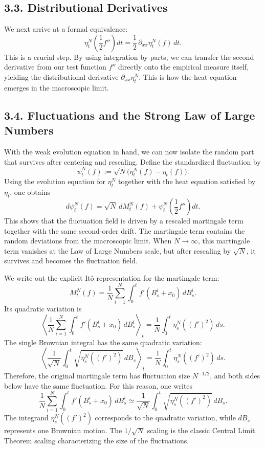 \documentclass[11pt]{article}
\theoremstyle{definition}
\theoremstyle{remark}
\begin{document}
\subsection*{3.3. Distributional Derivatives}
We next arrive at a formal equivalence:
\[
\eta_t^N\!\left(\frac{1}{2}f''\right)dt=\frac{1}{2}\,\partial_{xx}\eta_t^N(f)\,dt.
\]
This is a crucial step. By using integration by parts, we can transfer the second derivative from our test function $f''$ directly onto the empirical measure itself, yielding the distributional derivative $\partial_{xx}\eta_t^N$. This is how the heat equation emerges in the macroscopic limit.

\subsection*{3.4. Fluctuations and the Strong Law of Large Numbers}
With the weak evolution equation in hand, we can now isolate the random part that survives after centering and rescaling. Define the standardized fluctuation by
\[
\psi_t^N(f):=\sqrt{N}\bigl(\eta_t^N(f)-\eta_t(f)\bigr).
\]
Using the evolution equation for $\eta_t^N$ together with the heat equation satisfied by $\eta_t$, one obtains
\[
d\psi_t^N(f)=\sqrt{N}\,dM_t^N(f)+\psi_t^N\!\left(\frac{1}{2}f''\right)dt.
\]
This shows that the fluctuation field is driven by a rescaled martingale term together with the same second-order drift. The martingale term contains the random deviations from the macroscopic limit. When $N\to\infty$, this martingale term vanishes at the Law of Large Numbers scale, but after rescaling by $\sqrt{N}$, it survives and becomes the fluctuation field.

We write out the explicit It\^o representation for the martingale term:
\[
M_t^N(f)=\frac{1}{N}\sum_{i=1}^N \int_0^t f'(B_s^i+x_0)\,dB_s^i.
\]
Its quadratic variation is
\[
\left\langle
\frac{1}{N}\sum_{i=1}^N \int_0^t f'(B_s^i+x_0)\,dB_s^i
\right\rangle_t
=
\frac{1}{N}\int_0^t \eta_s^N((f')^2)\,ds.
\]
The single Brownian integral has the same quadratic variation:
\[
\left\langle
\frac{1}{\sqrt{N}}\int_0^t \sqrt{\eta_s^N((f')^2)}\,dB_s
\right\rangle_t
=
\frac{1}{N}\int_0^t \eta_s^N((f')^2)\,ds.
\]
Therefore, the original martingale term has fluctuation size $N^{-1/2}$, and both sides below have the same fluctuation. For this reason, one writes
\[
\frac{1}{N}\sum_{i=1}^N \int_0^t f'(B_s^i+x_0)\,dB_s^i \simeq \frac{1}{\sqrt{N}}\int_0^t \sqrt{\eta_s^N((f')^2)}\,dB_s.
\]
The integrand $\eta_s^N((f')^2)$ corresponds to the quadratic variation, while $dB_s$ represents one Brownian motion. The $1/\sqrt{N}$ scaling is the classic Central Limit Theorem scaling characterizing the size of the fluctuations.
\end{document}
